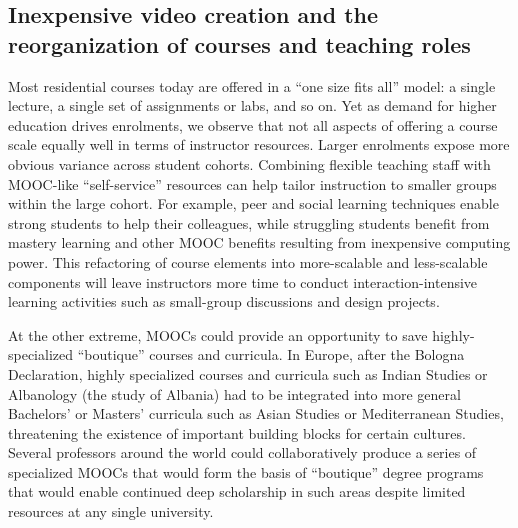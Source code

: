 \subsection{Inexpensive video creation and the reorganization of courses
  and teaching roles}

Most residential courses today are offered in a ``one size fits all''
model: a single lecture, a single set of assignments or labs, and so on.
Yet as demand for higher education drives enrolments, we observe that
not all aspects of offering a course scale equally well in terms of
instructor resources.
Larger enrolments expose more obvious variance across student cohorts.
Combining flexible teaching staff with MOOC-like ``self-service''
resources can help tailor instruction to smaller groups within the large
cohort.   For example, peer and social learning techniques enable
strong students to help their colleagues, while struggling students 
benefit from mastery learning and other MOOC benefits resulting from
inexpensive computing power.
This refactoring of course elements into more-scalable and less-scalable
components
will leave instructors more time to conduct
interaction-intensive learning activities such as small-group 
discussions and design projects.

At the other extreme, MOOCs could provide an opportunity to save
highly-specialized ``boutique'' courses and curricula.
In Europe, after the Bologna Declaration, highly specialized courses and
curricula such as Indian Studies or Albanology (the study of Albania)
had to be integrated into more general Bachelors' or Masters' curricula
such as Asian Studies or Mediterranean Studies, threatening the
existence of important building blocks for certain cultures.
Several professors around the world could collaboratively produce a
series of specialized MOOCs that would form the basis of ``boutique''
degree programs that would enable continued deep scholarship in such
areas despite limited resources at any single university.


